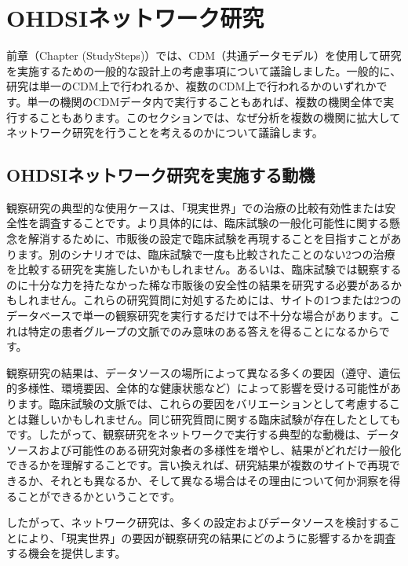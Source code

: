 \documentclass[
  11pt]{book}
\theoremstyle{definition}
\theoremstyle{definition}
\theoremstyle{definition}
\theoremstyle{definition}
\theoremstyle{remark}
\begin{document}
\section{OHDSIネットワーク研究}\label{ohdsiux30cdux30c3ux30c8ux30efux30fcux30afux7814ux7a76}


前章（Chapter \citet{ref}(StudySteps)）では、CDM（共通データモデル）を使用して研究を実施するための一般的な設計上の考慮事項について議論しました。一般的に、研究は単一のCDM上で行われるか、複数のCDM上で行われるかのいずれかです。単一の機関のCDMデータ内で実行することもあれば、複数の機関全体で実行することもあります。このセクションでは、なぜ分析を複数の機関に拡大してネットワーク研究を行うことを考えるのかについて議論します。

\subsection{OHDSIネットワーク研究を実施する動機}\label{ohdsiux30cdux30c3ux30c8ux30efux30fcux30afux7814ux7a76ux3092ux5b9fux65bdux3059ux308bux52d5ux6a5f}

観察研究の典型的な使用ケースは、「現実世界」での治療の比較有効性または安全性を調査することです。より具体的には、臨床試験の一般化可能性に関する懸念を解消するために、市販後の設定で臨床試験を再現することを目指すことがあります。別のシナリオでは、臨床試験で一度も比較されたことのない2つの治療を比較する研究を実施したいかもしれません。あるいは、臨床試験では観察するのに十分な力を持たなかった稀な市販後の安全性の結果を研究する必要があるかもしれません。これらの研究質問に対処するためには、サイトの1つまたは2つのデータベースで単一の観察研究を実行するだけでは不十分な場合があります。これは特定の患者グループの文脈でのみ意味のある答えを得ることになるからです。

観察研究の結果は、データソースの場所によって異なる多くの要因（遵守、遺伝的多様性、環境要因、全体的な健康状態など）によって影響を受ける可能性があります。臨床試験の文脈では、これらの要因をバリエーションとして考慮することは難しいかもしれません。同じ研究質問に関する臨床試験が存在したとしてもです。したがって、観察研究をネットワークで実行する典型的な動機は、データソースおよび可能性のある研究対象者の多様性を増やし、結果がどれだけ一般化できるかを理解することです。言い換えれば、研究結果が複数のサイトで再現できるか、それとも異なるか、そして異なる場合はその理由について何か洞察を得ることができるかということです。

したがって、ネットワーク研究は、多くの設定およびデータソースを検討することにより、「現実世界」の要因が観察研究の結果にどのように影響するかを調査する機会を提供します。
\end{document}
